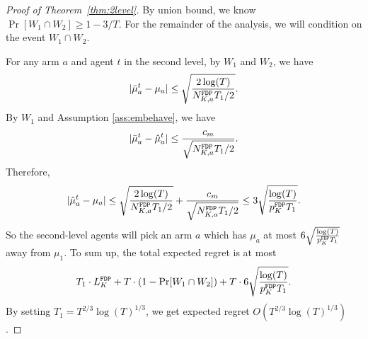 \begin{proof}[Proof of Theorem~\ref{thm:2level}]
By union bound, we know $\Pr[W_1 \cap W_2] \geq 1 - 3/T$. For the
remainder of the analysis, we will condition on the event
$W_1 \cap W_2$.

For any arm $a$ and agent $t$ in the second level, by $W_1$ and $W_2$, we have
\[
|\bar{\mu}^t_a - \mu_a| \leq \sqrt{\frac{2\log(T)}{N^\mathtt{FDP}_{K,a} T_1 /2}}.
\]
By $W_1$ and Assumption \ref{ass:embehave}, we have
\[
|\bar{\mu}^t_a - \hat{\mu}^t_a| \leq \frac{c_m}{\sqrt{N^\mathtt{FDP}_{K,a} T_1/2}}.
\]
Therefore,
\[
|\hat{\mu}^t_a - \mu_a|\leq \sqrt{\frac{2\log(T)}{N^\mathtt{FDP}_{K,a} T_1 /2}}+\frac{c_m}{\sqrt{N^\mathtt{FDP}_{K,a} T_1/2}} \leq 3 \sqrt{\frac{\log(T)}{p^\mathtt{FDP}_K T_1 }}.
\]
So the second-level agents will pick an arm $a$ which has $\mu_a$ at most $6 \sqrt{\frac{\log(T)}{p^\mathtt{FDP}_K T_1 }}$ away from $\mu_1$. To sum up, the total expected regret is at most
\[
T_1 \cdot L^\mathtt{FDP}_K + T \cdot (1-\Pr[W_1 \cap W_2]) + T \cdot  6 \sqrt{\frac{\log(T)}{p^\mathtt{FDP}_K T_1 }}.
\]
By setting $T_1 = T^{2/3}\log(T)^{1/3}$, we get expected regret $O(T^{2/3}\log(T)^{1/3})$.
\end{proof}
